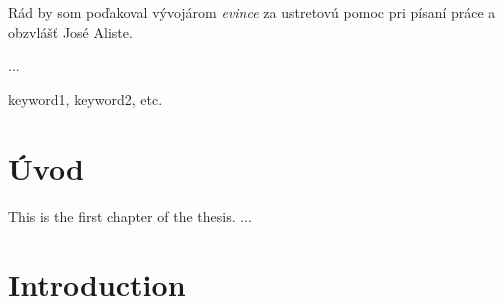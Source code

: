 \documentclass[12pt,oneside,draft]{fithesis2}
\begin{document}
  
\FrontMatter  
\ThesisTitlePage  
 
\begin{ThesisDeclaration}  
\DeclarationText  
\AdvisorName  
\end{ThesisDeclaration}  
 
\begin{ThesisThanks}  
Rád by som poďakoval vývojárom \emph{evince} za ustretovú pomoc pri písaní práce a obzvlášť José Aliste.
\end{ThesisThanks}  
 
\begin{ThesisAbstract}  
...
\end{ThesisAbstract}  
 
\begin{ThesisKeyWords}  
keyword1, keyword2, etc.  
\end{ThesisKeyWords}  
 
\MainMatter  
\chapter{Úvod}  
This is the first chapter of the thesis.   
...  
 
\tableofcontents          %
 
\chapter{Introduction}    %

 
\end{document}
